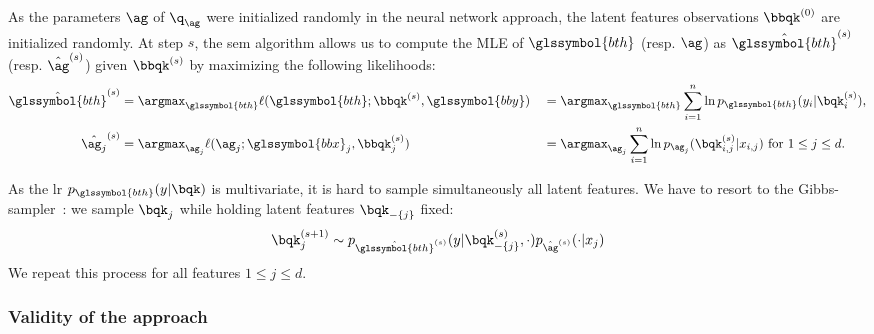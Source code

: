 As the parameters $\ag$ of $\q_{\ag}$ were initialized randomly in the neural network approach, the latent features observations $\bbqk^{(0)}$ are initialized randomly. At step $s$, the \gls{sem} algorithm allows us to compute the MLE of $\glssymbol{bth}$ (resp. $\ag$) as $\hat{\glssymbol{bth}}^{(s)}$ (resp. $\hat{\ag}^{(s)}$) given $\bbqk^{(s)}$ by maximizing the following likelihoods:
\begin{alignat}{2}
\hat{\glssymbol{bth}}^{(s)} & = \argmax_{\glssymbol{bth}} \ell(\glssymbol{bth}; \bbqk^{(s)}, \glssymbol{bby}) && = \argmax_{\glssymbol{bth}} \sum_{i=1}^n \ln p_{\glssymbol{bth}}(y_i | \bqk^{(s)}_i), \nonumber \\
\hat{\ag_j}^{(s)} & = \argmax_{\ag_j} \ell(\ag_j; \glssymbol{bbx}_j, \bbqk^{(s)}_j) && = \argmax_{\ag_j} \sum_{i=1}^n \ln p_{\ag_j}(\bqk^{(s)}_{i,j} | x_{i,j}) \text{ for } 1 \leq j \leq d. \label{eq:mle_ag}
\end{alignat}

As the \gls{lr} $p_{\glssymbol{bth}}(y | \bqk)$ is multivariate, it is hard to sample simultaneously all latent features. We have to resort to the Gibbs-sampler~\cite{casella1992explaining}: we sample $\bqk_j$ while holding latent features $\bqk_{-\{j\}}$ fixed:
\begin{equation} \label{eq:q_draw}
\bqk_j^{(s+1)} \sim p_{\hat{\glssymbol{bth}}^{(s)}}(y | \bqk_{-\{j\}}^{(s)}, \cdot) p_{\hat{\ag}^{(s)}}(\cdot | x_j)
\end{equation}
We repeat this process for all features $1 \leq j \leq d$.



\subsubsection{Validity of the approach}

